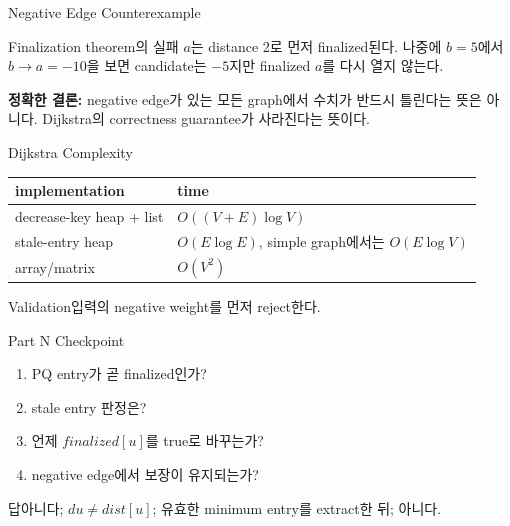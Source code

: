 \begin{frame}{Negative Edge Counterexample}
\centering{}
\small\begin{alertblock}{Finalization theorem의 실패}
\(a\)는 distance 2로 먼저 finalized된다. 나중에 \(b=5\)에서 \(b\to a=-10\)을 보면 candidate는 \(-5\)지만 finalized \(a\)를 다시 열지 않는다.

\textbf{정확한 결론:} negative edge가 있는 모든 graph에서 수치가 반드시 틀린다는 뜻은 아니다. Dijkstra의 correctness guarantee가 사라진다는 뜻이다.
\end{alertblock}
\end{frame}
\begin{frame}{Dijkstra Complexity}
\small\begin{tabular}{ll}\toprule
implementation&time\\\midrule
decrease-key heap + list&\(O((V+E)\log V)\)\\
stale-entry heap&\(O(E\log E)\), simple graph에서는 \(O(E\log V)\)\\
array/matrix&\(O(V^2)\)\\\bottomrule
\end{tabular}
\begin{block}{Validation}입력의 negative weight를 먼저 reject한다.\end{block}
\end{frame}
\begin{frame}{Part N Checkpoint}
\begin{enumerate}\item PQ entry가 곧 finalized인가?\item stale entry 판정은?\item 언제 \(finalized[u]\)를 true로 바꾸는가?\item negative edge에서 보장이 유지되는가?\end{enumerate}
\begin{exampleblock}{답}아니다; \(du\ne dist[u]\); 유효한 minimum entry를 extract한 뒤; 아니다.\end{exampleblock}
\end{frame}
